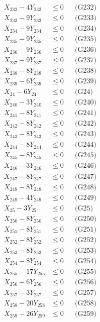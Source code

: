 \documentclass[a4paper,10pt]{article}
\begin{document}
{\begin{align}
X_{232} - 4Y_{232} &\leq 0 && \text{(G232)} \\
X_{233} - 9Y_{233} &\leq 0 && \text{(G233)} \\
X_{234} - 9Y_{234} &\leq 0 && \text{(G234)} \\
X_{235} - 9Y_{235} &\leq 0 && \text{(G235)} \\
X_{236} - 9Y_{236} &\leq 0 && \text{(G236)} \\
X_{237} - 9Y_{237} &\leq 0 && \text{(G237)} \\
X_{238} - 8Y_{238} &\leq 0 && \text{(G238)} \\
X_{239} - 6Y_{239} &\leq 0 && \text{(G239)} \\
X_{24} - 6Y_{24} &\leq 0 && \text{(G24)} \\
X_{240} - 3Y_{240} &\leq 0 && \text{(G240)} \\
X_{241} - 8Y_{241} &\leq 0 && \text{(G241)} \\
\allowbreak
X_{242} - 8Y_{242} &\leq 0 && \text{(G242)} \\
X_{243} - 8Y_{243} &\leq 0 && \text{(G243)} \\
X_{244} - 8Y_{244} &\leq 0 && \text{(G244)} \\
X_{245} - 8Y_{245} &\leq 0 && \text{(G245)} \\
X_{246} - 3Y_{246} &\leq 0 && \text{(G246)} \\
X_{247} - 8Y_{247} &\leq 0 && \text{(G247)} \\
X_{248} - 8Y_{248} &\leq 0 && \text{(G248)} \\
X_{249} - 4Y_{249} &\leq 0 && \text{(G249)} \\
X_{25} - 3Y_{25} &\leq 0 && \text{(G25)} \\
X_{250} - 8Y_{250} &\leq 0 && \text{(G250)} \\
X_{251} - 8Y_{251} &\leq 0 && \text{(G251)} \\
X_{252} - 8Y_{252} &\leq 0 && \text{(G252)} \\
X_{253} - 8Y_{253} &\leq 0 && \text{(G253)} \\
X_{254} - 8Y_{254} &\leq 0 && \text{(G254)} \\
X_{255} - 17Y_{255} &\leq 0 && \text{(G255)} \\
X_{256} - 6Y_{256} &\leq 0 && \text{(G256)} \\
X_{257} - 3Y_{257} &\leq 0 && \text{(G257)} \\
X_{258} - 20Y_{258} &\leq 0 && \text{(G258)} \\
X_{259} - 26Y_{259} &\leq 0 && \text{(G259)} \\

\end{align}}
\end{document}
